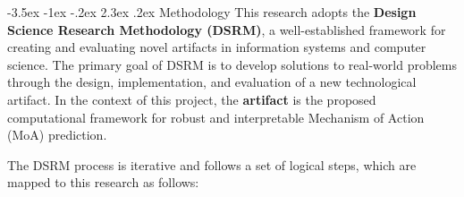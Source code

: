 \documentclass[12pt,a4paper]{article}
\makeatletter
\renewcommand\section{\@startsection{section}{1}{\z@}%
  {-3.5ex \@plus-1ex \@minus-.2ex}%
  {2.3ex \@plus.2ex}%
  {\normalfont\large\bfseries}}
\makeatother
\begin{document}
\section{Methodology}
This research adopts the \textbf{Design Science Research Methodology (DSRM)}, a well-established framework for creating and evaluating novel artifacts in information systems and computer science. The primary goal of DSRM is to develop solutions to real-world problems through the design, implementation, and evaluation of a new technological artifact. In the context of this project, the \textbf{artifact} is the proposed computational framework for robust and interpretable Mechanism of Action (MoA) prediction.

The DSRM process is iterative and follows a set of logical steps, which are mapped to this research as follows:
\end{document}
